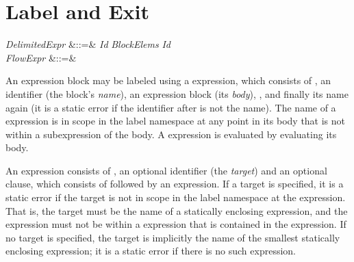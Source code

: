 %
%
%
%

\section{Label and Exit}

\begin{Grammar}
\emph{DelimitedExpr} &::=&
 \emph{Id} \emph{BlockElems}  \emph{Id} \\

\emph{FlowExpr}
&::=&    \\

\end{Grammar}

An expression block may be labeled using a  expression,
which consists of , an identifier (the block's \emph{name}),
an expression block (its \emph{body}), , and finally its name again
(it is a static error if the identifier after  is not the name).
The name of a  expression
is in scope in the label namespace
at any point in its body
that is not within a  subexpression of the body.
A  expression is evaluated
by evaluating its body.

An  expression consists of ,
an optional identifier (the \emph{target})
and an optional  clause,
which consists of  followed by an expression.
If a target is specified, it is
a static error if the target is not in scope
in the label namespace at the  expression.
That is, the target must be the name
of a statically enclosing  expression,
and the  expression must not be within
a  expression that is contained
in the  expression.
If no target is specified, the target is implicitly the name
of the smallest statically enclosing  expression; it is
a static error if there is no such expression.

